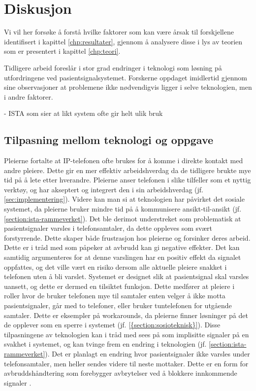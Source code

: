 \chapter{Diskusjon}
\label{chp:diskusjon}

Vi vil her forsøke å forstå hvilke faktorer som kan være årsak til forskjellene identifisert i kapittel \ref{chp:resultater}, gjennom å analysere disse i lys av teorien som er presentert i kapittel \ref{chp:teori}. 

Tidligere arbeid foreslår i stor grad endringer i teknologi som løsning på utfordringene ved pasientsignalsystemet. Forskerne oppdaget imidlertid gjennom sine observasjoner at problemene ikke nødvendigvis ligger i selve teknologien, men i andre faktorer. 

- ISTA som sier at likt system ofte gir helt ulik bruk

\section{Tilpasning mellom teknologi og oppgave}	
Pleierne fortalte at IP-telefonen ofte brukes for å komme i direkte kontakt med andre pleiere. Dette gir en mer effektiv arbeidshverdag da de tidligere brukte mye tid på å lete etter hverandre. Pleierne anser telefonen i slike tilfeller som et nyttig verktøy, og har akseptert og integrert den i sin arbeidshverdag (jf. \ref{sec:implementering}). Videre kan man si at teknologien har påvirket det sosiale systemet, da pleierne bruker mindre tid på å kommunisere ansikt-til-ansikt (jf. \ref{section:ista-rammeverket}). Det ble derimot understreket som problematisk at pasientsignaler varsles i telefonsamtaler, da dette oppleves som svært forstyrrende. Dette skaper både frustrasjon hos pleierne og forsinker deres arbeid. Dette er i tråd med \citet{Grundgeiger09} som påpeker at avbrudd kan gi negative effekter. Det kan samtidig argumenteres for at denne varslingen har en positiv effekt da signalet oppfattes, og det ville vært en risiko dersom alle aktuelle pleiere snakket i telefonen uten å bli varslet. Systemet er designet slik at pasientsignal skal varsles uansett, og dette er dermed en tilsiktet funksjon. Dette medfører at pleiere i roller hvor de bruker telefonen mye til samtaler enten velger å ikke motta pasientsignaler, går med to telefoner, eller bruker tuntelefonen for utgående samtaler. Dette er eksempler på workarounds, da pleierne finner løsninger på det de opplever som en sperre i systemet (jf. \ref{{section:sosioteknisk}}). Disse tilpasningene av teknologien kan i tråd med \citet{Coiera07} sees på som implisitte signaler på en svakhet i systemet, og kan tvinge frem en endring i teknologien (jf. \ref{section:ista-rammeverket}). Det er planlagt en endring hvor pasientsignaler ikke varsles under telefonsamtaler, men heller sendes videre til neste mottaker. Dette er en form for avbruddshåndtering som forebygger avbrytelser ved å blokkere innkommende signaler \citep{Grandhi10}.
	

